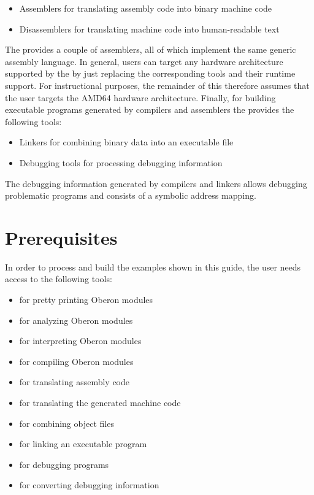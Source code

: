 \begin{itemize}
\item Assemblers for translating assembly code into binary machine code
\item Disassemblers for translating machine code into human-readable text
\end{itemize}

The \ecs{} provides a couple of assemblers, all of which implement the same generic assembly language.
\seeassembly
In general, users can target any hardware architecture supported by the \ecs{} by just replacing the corresponding tools and their runtime support.
For instructional purposes, the remainder of this \documentation{} therefore assumes that the user targets the AMD64 hardware architecture.
\seeamd
Finally, for building executable programs generated by compilers and assemblers the \ecs{} provides the following tools:

\begin{itemize}
\item Linkers for combining binary data into an executable file
\item Debugging tools for processing debugging information
\end{itemize}

The debugging information generated by compilers and linkers allows debugging problematic programs and consists of a symbolic address mapping.
\seedebugging

\section{Prerequisites}

In order to process and build the examples shown in this guide, the user needs access to the following tools:

\begin{itemize}
\item {} for pretty printing Oberon modules
\item {} for analyzing Oberon modules
\item {} for interpreting Oberon modules
\item {} for compiling Oberon modules
\item {} for translating assembly code
\item {} for translating the generated machine code
\item {} for combining object files
\item {} for linking an executable program
\item {} for debugging programs
\item {} for converting debugging information
\end{itemize}

